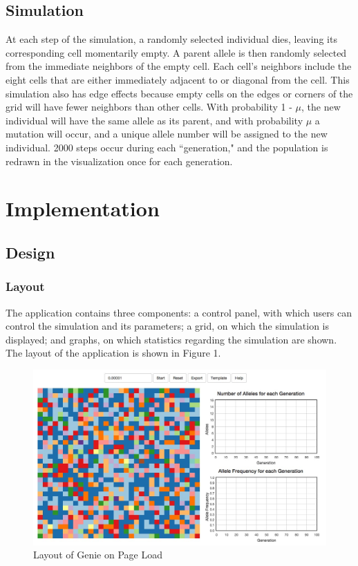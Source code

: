 \documentclass[12pt]{article}
\begin{document}
\begin{spacing}{1.5}
\subsection{Simulation}
At each step of the simulation, a randomly selected individual dies, leaving its corresponding cell momentarily empty. A parent allele is then randomly selected from the immediate neighbors of the empty cell. Each cell's neighbors include the eight cells that are either immediately adjacent to or diagonal from the cell. This simulation also has edge effects because empty cells on the edges or corners of the grid will have fewer neighbors than other cells. With probability 1 - $\mu$, the new individual will have the same allele as its parent, and with probability $\mu$ a mutation will occur, and a unique allele number will be assigned to the new individual. 2000 steps occur during each ``generation," and the population is redrawn in the visualization once for each generation.

\section{Implementation}

\subsection{Design}

\subsubsection{Layout}
The application contains three components: a control panel, with which users can control the simulation and its parameters; a grid, on which the simulation is displayed; and graphs, on which statistics regarding the simulation are shown. The layout of the application is shown in Figure 1.
\begin{figure}[h]
\caption{Layout of Genie on Page Load}
\centering
\includegraphics[scale=0.4]{layout}
\end{figure}


\end{spacing}
\end{document}
